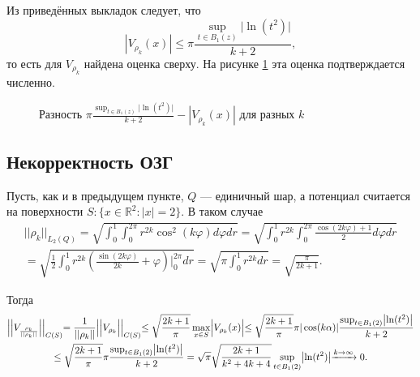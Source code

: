 \documentclass[a4paper, 12pt]{article}
\newcommand{\R}[1]{\mathbb{R}^#1}
\begin{document}
Из приведённых выкладок следует, что 
\begin{equation}
   | V_{\rho_k}(x)| \leq \pi \frac{\sup_{t \in B_1(z)} \bigl| \ln (t^2) \bigl|}{k+2},
\end{equation}
то есть для $V_{\rho_k}$ найдена оценка сверху. На рисунке \ref{chis} эта оценка подтверждается численно.
\begin{figure}[h!]
  \noindent{}
  \caption{Разность $\pi \frac{\sup_{t \in B_1(z)} \bigl| \ln (t^2) \bigl|}{k+2} -| V_{\rho_k}(x)| $ для разных $k$}
  \label{chis}
  \end{figure} 

\subsection{Некорректность ОЗГ}
Пусть, как и в предыдущем пункте, $Q$ --- единичный шар, а потенциал считается на поверхности $S: \{x\in \R{2}: |x|=2 \}$. В таком случае
\begin{multline}
    ||\rho_k ||_{L_2(Q)}=\sqrt{\int_0^1 \int_0^{2 \pi} r^{2k} \cos^2(k \varphi) d\varphi dr}= \sqrt{\int_0^1 r^{2k} \int_0^{2 \pi} \frac{\cos(2k \varphi)+1}{2}  d\varphi dr}\\
    =\sqrt{\frac{1}{2} \int_0^1 r^{2k} \left( \frac{\sin(2k \varphi)}{2k} +\varphi\right)\Biggl|_0^{2 \pi} dr}= \sqrt{\pi \int_0^1 r^{2k} dr}=\sqrt{\frac{\pi}{2k+1}}.
\end{multline}

Тогда
\begin{multline}
    \Bigl|\Bigl|V_{\frac{\rho_k}{||\rho_k ||}}  \Bigl|\Bigl|_{C(S)}= \frac{1}{||\rho_k ||} \Bigl|\Bigl|V_{\rho_k}  \Bigl|\Bigl|_{C(S)} \leq \sqrt{\frac{2k+1}{\pi}} \max_{x \in S} \Bigl| V_{\rho_k}(x) \Bigl| \leq \sqrt{\frac{2k+1}{\pi}} \pi |\cos(k\alpha)| \frac{\sup_{t \in B_1(2)} \bigl| \ln (t^2) \bigl|}{k+2} \\
    \leq \sqrt{\frac{2k+1}{\pi}} \pi \frac{\sup_{ t \in B_1(2)} \bigl| \ln (t^2) \bigl|}{k+2} = \sqrt{\pi} \sqrt{\frac{2k+1}{k^2 + 4k+4}}\sup_{t \in B_1(2)} \bigl| \ln (t^2) \bigl| \xrightarrow{k \rightarrow \infty} 0.
\end{multline}
\end{document}
